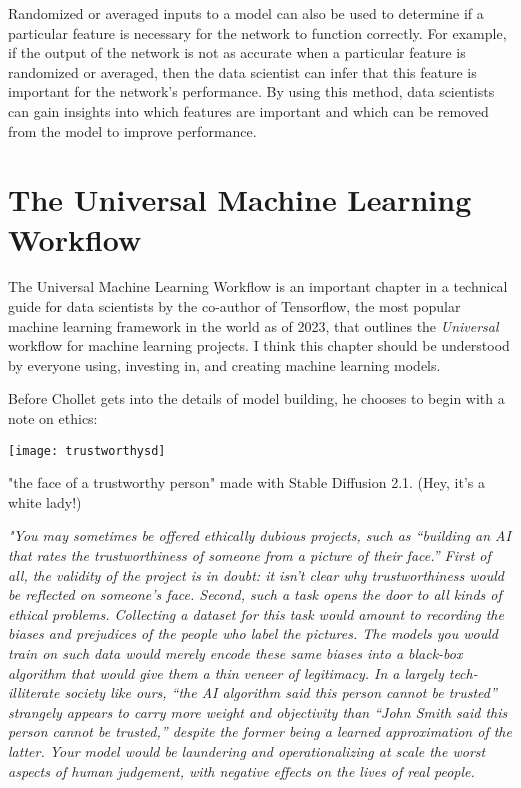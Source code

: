 Randomized or averaged inputs to a model can also be used to determine if a particular feature is necessary for the network to function correctly. For example, if the output of the network is not as accurate when a particular feature is randomized or averaged, then the data scientist can infer that this feature is important for the network’s performance. By using this method, data scientists can gain insights into which features are important and which can be removed from the model to improve performance.

\section{The Universal Machine Learning Workflow}

The Universal Machine Learning Workflow is an important chapter in a technical guide for data scientists by the co-author of Tensorflow, the most popular machine learning framework in the world as of 2023, that outlines the \textit{Universal} workflow for machine learning projects. I think this chapter should be understood by everyone using, investing in, and creating machine learning models.

Before Chollet gets into the details of model building, he chooses to begin with a note on ethics:

\begin{pdf}
\begin{marginfigure}[-5.5cm]
        \texttt{[image: trustworthysd]}
        \caption{"the face of a trustworthy person" made with Stable Diffusion 2.1. (Hey, it's a white lady!)}
\end{marginfigure}
\end{pdf}

\textit{"You may sometimes be offered ethically dubious projects, such as “building an AI that rates the trustworthiness of someone from a picture of their face.” First of all, the validity of the project is in doubt: it isn’t clear why trustworthiness would be reflected on someone’s face. Second, such a task opens the door to all kinds of ethical problems. Collecting a dataset for this task would amount to recording the biases and prejudices of the people who label the pictures. The models you would train on such data would merely encode these same biases into a black-box algorithm that would give them a thin veneer of legitimacy. In a largely tech-illiterate society like ours, “the AI algorithm said this person cannot be trusted” strangely appears to carry more weight and objectivity than “John Smith said this person cannot be trusted,” despite the former being a learned approximation of the latter. Your model would be laundering and operationalizing at scale the worst aspects of human judgement, with negative effects on the lives of real people.} \cite{chollet2022}


